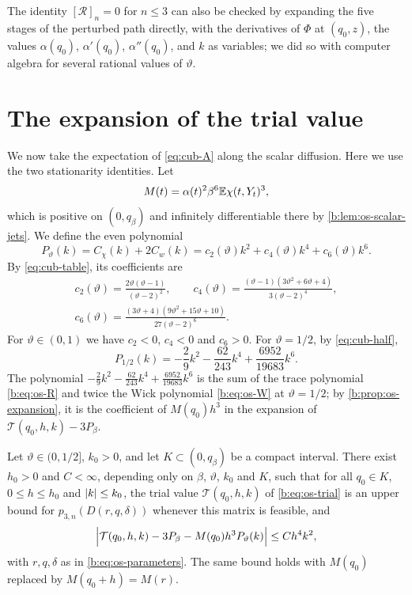 The identity $[\mathcal R]_n=0$ for $n\le3$ can also be checked by expanding
the five stages of the perturbed path directly, with the derivatives of $\Phi$
at $(q_0,z)$, the values $\alpha(q_0)$, $\alpha'(q_0)$, $\alpha''(q_0)$, and $k$
as variables; we did so with computer algebra for several rational values of
$\vartheta$.

\section{The expansion of the trial value}\label{sec:cub-expansion}

We now take the expectation of \eqref{eq:cub-A} along the scalar diffusion.
Here we use the two stationarity identities. Let
\begin{equation}\label{eq:cub-M}
 M(t)=\alpha(t)^2\beta^6\mathbb E\chi(t,Y_t)^3,
\end{equation}
which is positive on $(0,q_\beta)$ and infinitely differentiable there by
\cref{b:lem:os-scalar-jets}. We define the even polynomial
\[
 P_\vartheta(k)=C_\chi(k)+2C_w(k)=c_2(\vartheta)k^2+c_4(\vartheta)k^4
 +c_6(\vartheta)k^6.
\]
By \eqref{eq:cub-table}, its coefficients are
\begin{equation}\label{eq:cub-c}
\begin{gathered}
 c_2(\vartheta)=\frac{2\vartheta(\vartheta-1)}{(\vartheta-2)^2},\qquad
 c_4(\vartheta)=\frac{(\vartheta-1)(3\vartheta^2+6\vartheta+4)}{3(\vartheta-2)^4},\\
 c_6(\vartheta)=\frac{(3\vartheta+4)(9\vartheta^2+15\vartheta+10)}{27(\vartheta-2)^6}.
\end{gathered}
\end{equation}
For $\vartheta\in(0,1)$ we have $c_2<0$, $c_4<0$ and $c_6>0$.
For $\vartheta=1/2$, by \eqref{eq:cub-half},
\begin{equation}\label{eq:cub-P-half}
 P_{1/2}(k)=-\frac29k^2-\frac{62}{243}k^4+\frac{6952}{19683}k^6.
\end{equation}
The polynomial $-\frac29k^2-\frac{62}{243}k^4+\frac{6952}{19683}k^6$ is the
sum of the trace polynomial \eqref{b:eq:os-R} and twice the Wick polynomial
\eqref{b:eq:os-W} at $\vartheta=1/2$; by \cref{b:prop:os-expansion}, it is the
coefficient of $M(q_0)h^3$ in the expansion of $\mathcal T(q_0,h,k)-3P_\beta$.

\begin{proposition}\label{b:prop:os-expansion}
Let $\vartheta\in(0,1/2]$, $k_0>0$, and let $K\subset(0,q_\beta)$ be a compact
interval. There exist $h_0>0$ and $C<\infty$, depending only on $\beta$,
$\vartheta$, $k_0$ and $K$, such that for all $q_0\in K$, $0\le h\le h_0$ and
$\lvert k\rvert\le k_0$, the trial value $\mathcal T(q_0,h,k)$ of \eqref{b:eq:os-trial}
is an upper bound for $p_{3,n}(D(r,q,\delta))$ whenever this matrix is
feasible, and
\begin{equation}\label{b:eq:finiteE-polynomial}
 \Bigl|\mathcal T(q_0,h,k)-3P_\beta-M(q_0)h^3P_\vartheta(k)\Bigr|\le Ch^4k^2,
\end{equation}
with $r,q,\delta$ as in \eqref{b:eq:os-parameters}. The same bound holds with
$M(q_0)$ replaced by $M(q_0+h)=M(r)$.
\end{proposition}

